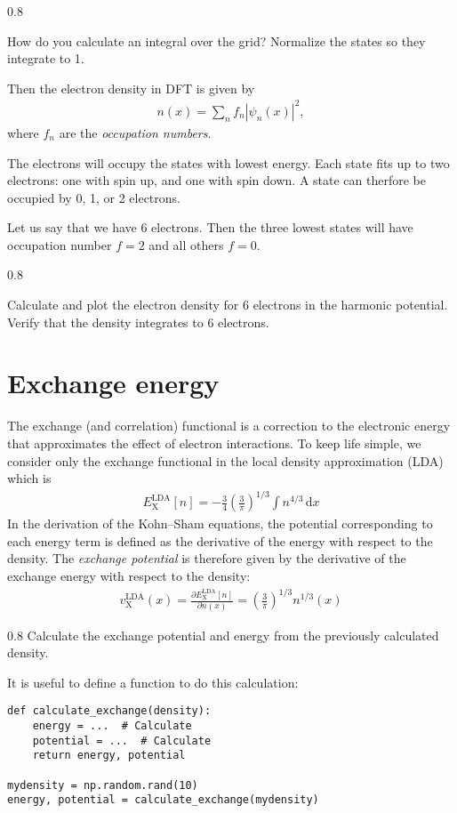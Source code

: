 \documentclass{article}
\newcommand{\exercise}[1]{
  \bigskip
  \begin{boxedminipage}[c]{0.8\linewidth}
  #1
  \end{boxedminipage}
  \bigskip
}
\newcommand{\dee}[0]{\mathrm d}
\newcommand{\idee}[0]{\,\dee}
\newcommand{\pdiff}[2]{\frac{\partial #1}{\partial #2}}
\newcommand{\X}[0]{\mathrm{X}}
\newcommand{\LDA}[0]{\mathrm{LDA}}
\begin{document}
\exercise{
How do you calculate an integral over the grid?
Normalize the states so they integrate to 1.
}

Then the electron density in DFT is given by
\begin{align}
  n(x) = \sum_n f_n |\psi_n(x)|^2,
\end{align}
where $f_n$ are the \emph{occupation numbers}.

The electrons will
occupy the states with lowest energy.  Each
state fits up to two electrons: one with spin up, and one with spin down.
A state can therfore be occupied by 0, 1, or 2 electrons.

Let us say that we have 6 electrons.  Then the three lowest states
will have occupation number $f=2$ and all others $f=0$.

\exercise{
Calculate and plot the electron density for 6 electrons in the harmonic potential.
Verify that the density integrates to 6 electrons.
}

\section{Exchange energy}
The exchange (and correlation) functional is a correction to the
electronic energy that approximates the effect of electron interactions.
To keep life simple, we consider only the exchange functional in the local density approximation (LDA) which is
\begin{align}
  E_\X^\LDA[n] = -\frac 34 \left(\frac 3 \pi\right)^{1/3} \int n^{4/3} \idee x
\end{align}
In the derivation of the Kohn--Sham equations, the potential
corresponding to each energy term is defined
as the derivative of the energy with respect to the density.
The \emph{exchange potential} is therefore given by the derivative
of the exchange energy with respect to the density:
\begin{align}
  v_{\X}^\LDA(x) = \pdiff{E_\X^\LDA[n]}{n(x)} = \left(\frac3 \pi\right)^{1/3}
  n^{1/3}(x)
\end{align}

\exercise{Calculate the exchange potential and energy from the previously
calculated density.}

It is useful to define a function to do this calculation:
\begin{lstlisting}
def calculate_exchange(density):
    energy = ...  # Calculate
    potential = ...  # Calculate
    return energy, potential

mydensity = np.random.rand(10)
energy, potential = calculate_exchange(mydensity)
\end{lstlisting}
\end{document}
